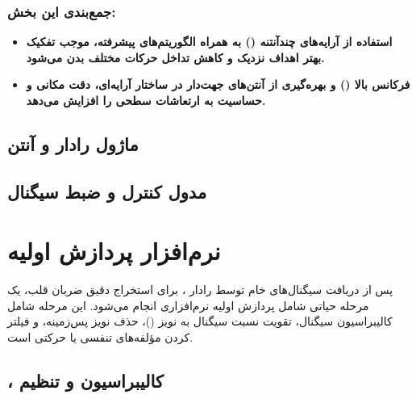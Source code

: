 \subsubsection*{جمع‌بندی این بخش:} %
\begin{itemize}
    \item \textbf{استفاده از آرایه‌های چندآنتنه () به همراه الگوریتم‌های  پیشرفته، موجب تفکیک بهتر اهداف نزدیک و کاهش تداخل حرکات مختلف بدن می‌شود.}
    \item \textbf{فرکانس بالا () و بهره‌گیری از آنتن‌های جهت‌دار در ساختار آرایه‌ای، دقت مکانی و حساسیت به ارتعاشات سطحی را افزایش می‌دهد.}
\end{itemize}
\subsection{ماژول رادار و آنتن} %
\label{sec:radar-module-antenna}

\subsection{مدول کنترل و ضبط سیگنال} %
\label{sec:control-signal-module}

\section{نرم‌افزار پردازش اولیه} %
\label{sec:initial-processing-software}

پس از دریافت سیگنال‌های خام توسط رادار ، برای استخراج دقیق ضربان قلب، یک مرحله حیاتی شامل پردازش اولیه نرم‌افزاری انجام می‌شود. این مرحله شامل کالیبراسیون سیگنال، تقویت نسبت سیگنال به نویز ()، حذف نویز پس‌زمینه، و فیلتر کردن مؤلفه‌های تنفسی یا حرکتی است.

\subsection{، کالیبراسیون و تنظیم} %
\label{sec:snr-calibration-adjustment}

